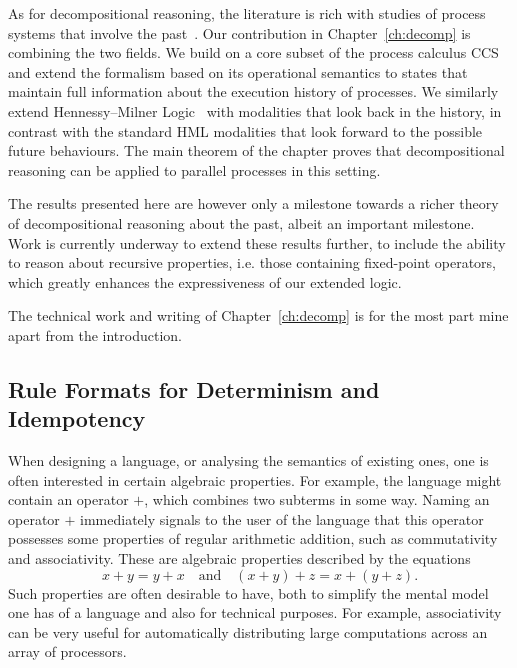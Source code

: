 As for decompositional reasoning, the literature is rich with studies of process systems
that involve the past~\cite{HennessyS85,Phillips06,Laroussinie00,DeNicola:1990}.
Our contribution in Chapter~\ref{ch:decomp} is combining the two fields. We build
on a core subset of the process calculus CCS~\cite{Milner80} and extend
the formalism based on its operational semantics to states that maintain full
information about the execution history of processes. We similarly extend Hennessy--Milner
Logic~\cite{HennessyM80} with modalities that look back in the history, 
in contrast with the standard HML modalities that look forward to the possible
future behaviours.
The main theorem of the chapter
proves that decompositional reasoning can be applied to parallel processes in this
setting.

The results presented here are however only a milestone towards a richer theory
of decompositional reasoning about the past, albeit an important milestone. Work
is currently underway to extend these results further, to include the ability to
reason about recursive properties, i.e. those containing fixed-point operators, 
which greatly enhances the expressiveness of our extended logic.

The technical work and writing of Chapter~\ref{ch:decomp} is for the most part
mine apart from the introduction.


\subsection{Rule Formats for Determinism and Idempotency} %

When designing a language, or analysing the semantics of existing ones,
one is often interested in certain algebraic properties. For example, the language
might contain an operator $+$, which combines two subterms in some way. Naming
an operator $+$ immediately signals to the user of the language that this operator
possesses some properties of regular arithmetic addition, such as commutativity
and associativity. These are algebraic properties described by the equations
\[
    x + y = y + x  \quad\textrm{and}\quad (x + y) + z = x + (y + z).
\]
Such properties are often desirable to have, both to simplify the mental model
one has of a language and also for technical purposes. For example, associativity
can be very useful for automatically distributing large computations across an
array of processors.

